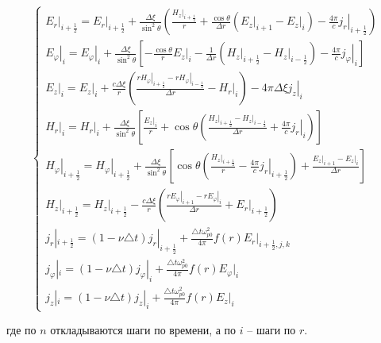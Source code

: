 \documentclass[a4paper]{article}
\begin{document}
	\begin{equation*}
		\begin{cases*}
			\left.E_{r}\right|_{i+\frac{1}{2}}=\left.E_{r}\right|_{i+\frac{1}{2}}+\frac{\Delta\xi}{\sin^{2}\theta}\left(\frac{\left.H_{z}\right|_{i+\frac{1}{2}}}{r}+\frac{\cos\theta}{\Delta r}\left(\left.E_{z}\right|_{i+1}-\left.E_{z}\right|_{i}\right)-\frac{4\pi}{c}\left.j_{r}\right|_{i+\frac{1}{2}}\right)\\	\left.E_{\varphi}\right|_{i}=\left.E_{\varphi}\right|_{i}+\frac{\Delta\xi}{\sin^{2}\theta}\left[-\frac{\cos\theta}{r}\left.E_{z}\right|_{i}-\frac{1}{\Delta r}\left(\left.H_{z}\right|_{i+\frac{1}{2}}-\left.H_{z}\right|_{i-\frac{1}{2}}\right)-\frac{4\pi}{c}\left.j_{\varphi}\right|_{i} \right]\\
			\left.E_{z}\right|_{i}=\left.E_{z}\right|_{i}+\frac{c\Delta\xi}{r}\left(\frac{\left.rH_{\varphi}\right|_{i+\frac{1}{2}}-\left.rH_{\varphi}\right|_{i-\frac{1}{2}}}{\Delta r}-\left.H_{r}\right|_{i}\right)-\left.4\pi\Delta\xi j_{z}\right|_{i}\\
			\left.H_{r}\right|_{i}=\left.H_{r}\right|_{i}+\frac{\Delta\xi}{\sin^{2}\theta}\left[\frac{\left.E_{z}\right|_{i}}{r}+\cos\theta\left(\frac{\left.H_{z}\right|_{i+\frac{1}{2}}-\left.H_{z}\right|_{i-\frac{1}{2}}}{\Delta r}+\frac{4\pi}{c}\left.j_{r}\right|_{i}\right)\right]\\
			\left.H_{\varphi}\right|_{i+\frac{1}{2}}=\left.H_{\varphi}\right|_{i+\frac{1}{2}}+\frac{\Delta\xi}{\sin^{2}\theta}\left[\cos\theta\left(\frac{\left.H_{z}\right|_{i+\frac{1}{2}}}{r}-\frac{4\pi}{c}\left.j_{r}\right|_{i+\frac{1}{2}}\right)+\frac{\left.E_{z}\right|_{i+1}-\left.E_{z}\right|_{i}}{\Delta r}\right]\\
			\left.H_{z}\right|_{i+\frac{1}{2}}=\left.H_{z}\right|_{i+\frac{1}{2}}-\frac{c\Delta\xi}{r}\left(\frac{\left.rE_{\varphi}\right|_{i+1}-\left.rE_{\varphi}\right|_{i}}{\Delta r}+\left.E_{r}\right|_{i+\frac{1}{2}}\right)\\
			j_{r}|_{i+\frac{1}{2}}=(1-\nu\triangle t) j_{r}|_{i+\frac{1}{2}}+\frac{\triangle t\omega_{p0}^{2}}{4\pi} f(r)E_r|_{i+\frac{1}{2},j,k}\\
			j_{\varphi}|_{i}=(1-\nu\triangle t) j_{\varphi}|_{i}+\frac{\triangle t\omega_{p0}^{2}}{4\pi}f(r)E_{\varphi}|_{i}\\
			j_{z}|_{i}=(1-\nu\triangle t) j_{z}|_{i}+\frac{\triangle t\omega_{p0}^{2}}{4\pi}f(r)E_{z}|_{i}
		\end{cases*}
	\end{equation*}


где по $n$ откладываются шаги по времени, а по $i$ -- шаги по $r$.
\newpage
\end{document}
